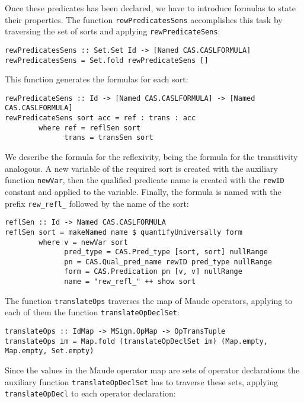 Once these predicates has been declared, we have to introduce
formulas to state their properties. The function \verb"rewPredicatesSens"
accomplishes this task by traversing the set of sorts and applying
\verb"rewPredicateSens":

{\codesize
\begin{verbatim}
rewPredicatesSens :: Set.Set Id -> [Named CAS.CASLFORMULA]
rewPredicatesSens = Set.fold rewPredicateSens []
\end{verbatim}
}

This function generates the formulas for each sort:

{\codesize
\begin{verbatim}
rewPredicateSens :: Id -> [Named CAS.CASLFORMULA] -> [Named CAS.CASLFORMULA]
rewPredicateSens sort acc = ref : trans : acc
        where ref = reflSen sort
              trans = transSen sort
\end{verbatim}
}

We describe the formula for the reflexivity, being the formula for the
transitivity analogous. A new variable of the required sort is created with
the auxiliary function \verb"newVar", then the qualified predicate
name is created with the \verb"rewID" constant and applied to the
variable. Finally, the formula is named with the prefix \verb"rew_refl_"
followed by the name of the sort:

{\codesize
\begin{verbatim}
reflSen :: Id -> Named CAS.CASLFORMULA
reflSen sort = makeNamed name $ quantifyUniversally form
        where v = newVar sort
              pred_type = CAS.Pred_type [sort, sort] nullRange
              pn = CAS.Qual_pred_name rewID pred_type nullRange
              form = CAS.Predication pn [v, v] nullRange
              name = "rew_refl_" ++ show sort
\end{verbatim}
}

The function \verb"translateOps" traverses the map of Maude operators,
applying to each of them the function \verb"translateOpDeclSet":

{\codesize
\begin{verbatim}
translateOps :: IdMap -> MSign.OpMap -> OpTransTuple
translateOps im = Map.fold (translateOpDeclSet im) (Map.empty, Map.empty, Set.empty)
\end{verbatim}
}

Since the values in the Maude operator map are sets of operator declarations
the auxiliary function \verb"translateOpDeclSet" has to traverse these sets, applying
\verb"translateOpDecl" to each operator declaration:

